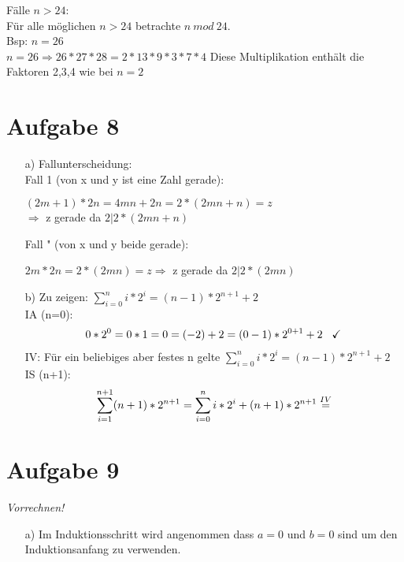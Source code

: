 \documentclass[paper = a4, ngerman]{scrartcl}
\begin{document}
\begin{itemize}
			Fälle $n>24$:\\
				Für alle möglichen $n>24$ betrachte $n\ mod\ 24$.\\
				Bsp: $n=26$\\
				$n=26 \Rightarrow 26*27*28 = 2*13*9*3*7*4$
				Diese Multiplikation enthält die Faktoren 2,3,4 wie bei $n=2$
		\end{itemize}
	
	
	\section*{Aufgabe 8}
		\begin{itemize}
			\item[a)] Fallunterscheidung:\\
			Fall 1 (von x und y ist eine Zahl gerade):
			\begin{center}
				$(2m + 1) * 2n = 4mn + 2n = 2*(2mn + n) = z $\\$\Rightarrow$ z gerade da $2|2*(2mn + n)$
			\end{center}
			Fall " (von x und y beide gerade):
			\begin{center}
				$2m * 2n = 2*(2mn) = z \Rightarrow$ z gerade da $2|2*(2mn)$
			\end{center}
		\pagebreak
			\item[b)] Zu zeigen: $\displaystyle\sum_{i=0}^{n} i*2^i = (n-1)*2^{n+1}+2$\\
			IA (n=0):
			\begin{align*}
				0*2^0 = 0*1 = 0 = (-2) + 2 = (0-1)*2^{0+1}+2 \hspace{3mm}\checkmark
			\end{align*}
			IV: Für ein beliebiges aber festes n gelte $\displaystyle\sum_{i=0}^{n} i*2^i = (n-1)*2^{n+1}+2$\\
			IS (n+1):
			\begin{align*}
				\displaystyle\sum_{i=1}^{n+1} (n+1)*2^{n+1} = \sum_{i=0}^{n} i*2^i + (n+1)*2^{n+1} \overset{\tiny{IV}}{=}\\
				
			\end{align*}
		\end{itemize}
	
	\pagebreak
	\section*{Aufgabe 9}
	\textit{Vorrechnen!}
		\begin{itemize}
			\item[a)] Im Induktionsschritt wird angenommen dass $a=0$ und $b=0$ sind um den Induktionsanfang zu verwenden.
		\end{itemize}
	
\end{document}
